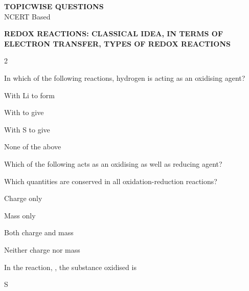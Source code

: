 \documentclass[10pt,a4paper]{article}
\begin{document}
\begin{center}
  {\Large\textbf{TOPICWISE QUESTIONS}}\\[4pt]
  {\small NCERT Based}
\end{center}

\begin{mdframed}[backgroundcolor=sectionbg, linewidth=0pt, innerleftmargin=6pt, innerrightmargin=6pt, innertopmargin=4pt, innerbottommargin=4pt]
\color{white}\bfseries\small REDOX REACTIONS: CLASSICAL IDEA, IN TERMS OF ELECTRON TRANSFER, TYPES OF REDOX REACTIONS
\end{mdframed}

\begin{multicols}{2}
\begin{questions}

\item In which of the following reactions, hydrogen is acting as an oxidising agent?
\begin{options}
  \item With Li to form 
  \item With  to give 
  \item With S to give 
  \item None of the above
\end{options}

\item Which of the following acts as an oxidising as well as reducing agent?
\begin{options}
  \item {}
  \item {}
  \item {}
  \item {}
\end{options}

\item Which quantities are conserved in all oxidation-reduction reactions?
\begin{options}
  \item Charge only
  \item Mass only
  \item Both charge and mass
  \item Neither charge nor mass
\end{options}

\item In the reaction, , the substance oxidised is
\begin{options}
  \item {}
  \item {}
  \item S
  \item {}
\end{options}


\end{questions}
\end{multicols}
\end{document}
